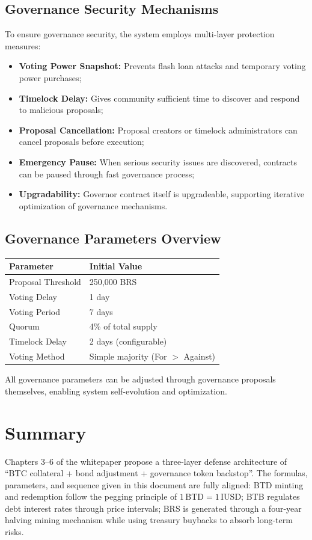\documentclass{article}
\begin{document}
\subsection{Governance Security Mechanisms}

To ensure governance security, the system employs multi-layer protection measures:

\begin{itemize}
  \item \textbf{Voting Power Snapshot:} Prevents flash loan attacks and temporary voting power purchases;
  \item \textbf{Timelock Delay:} Gives community sufficient time to discover and respond to malicious proposals;
  \item \textbf{Proposal Cancellation:} Proposal creators or timelock administrators can cancel proposals before execution;
  \item \textbf{Emergency Pause:} When serious security issues are discovered, contracts can be paused through fast governance process;
  \item \textbf{Upgradability:} Governor contract itself is upgradeable, supporting iterative optimization of governance mechanisms.
\end{itemize}

\subsection{Governance Parameters Overview}

\begin{center}
\begin{tabular}{ll}
\toprule
Parameter & Initial Value \\
\midrule
Proposal Threshold & 250,000 BRS \\
Voting Delay & 1 day \\
Voting Period & 7 days \\
Quorum & 4\% of total supply \\
Timelock Delay & 2 days (configurable) \\
Voting Method & Simple majority (For $>$ Against) \\
\bottomrule
\end{tabular}
\end{center}

All governance parameters can be adjusted through governance proposals themselves, enabling system self-evolution and optimization.

\section{Summary}
Chapters 3--6 of the whitepaper propose a three-layer defense architecture of ``BTC collateral + bond adjustment + governance token backstop''. The formulas, parameters, and sequence given in this document are fully aligned: BTD minting and redemption follow the pegging principle of $1\,\text{BTD}=1\,\text{IUSD}$; BTB regulates debt interest rates through price intervals; BRS is generated through a four-year halving mining mechanism while using treasury buybacks to absorb long-term risks.
\end{document}
